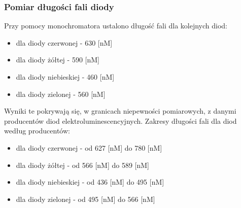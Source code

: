 \documentclass[11pt]{article}
\begin{document}
    \subsubsection*{Pomiar długości fali diody}
    Przy pomocy monochromatora ustalono długość fali dla kolejnych diod:
    \begin{itemize}
        \item dla diody czerwonej - 630 [nM]
        \item dla diody żółtej - 590 [nM]
        \item dla diody niebieskiej - 460 [nM]
        \item dla diody zielonej - 560 [nM]
    \end{itemize}
    Wyniki te pokrywają się, w granicach niepewności pomiarowych, z
    danymi producentów diod elektroluminescencyjnych. Zakresy długości fali dla diod według producentów:
    \begin{itemize}
        \item dla diody czerwonej - od 627 [nM] do 780 [nM]
        \item dla diody żółtej - od 566 [nM] do 589 [nM]
        \item dla diody niebieskiej - od 436 [nM] do 495 [nM]
        \item dla diody zielonej - od 495 [nM] do 566 [nM]
    \end{itemize}
\end{document}
